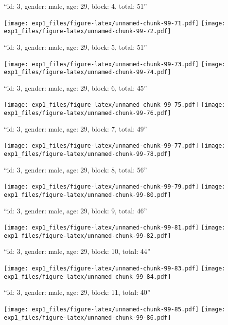 \documentclass[,]{article}
\begin{document}
\newpage
[1] 

``id: 3, gender: male, age: 29, block: 4, total: 51''

\texttt{[image: exp1\_files/figure-latex/unnamed-chunk-99-71.pdf]}
\texttt{[image: exp1\_files/figure-latex/unnamed-chunk-99-72.pdf]}

\newpage
[1] 

``id: 3, gender: male, age: 29, block: 5, total: 51''

\texttt{[image: exp1\_files/figure-latex/unnamed-chunk-99-73.pdf]}
\texttt{[image: exp1\_files/figure-latex/unnamed-chunk-99-74.pdf]}

\newpage
[1] 

``id: 3, gender: male, age: 29, block: 6, total: 45''

\texttt{[image: exp1\_files/figure-latex/unnamed-chunk-99-75.pdf]}
\texttt{[image: exp1\_files/figure-latex/unnamed-chunk-99-76.pdf]}

\newpage
[1] 

``id: 3, gender: male, age: 29, block: 7, total: 49''

\texttt{[image: exp1\_files/figure-latex/unnamed-chunk-99-77.pdf]}
\texttt{[image: exp1\_files/figure-latex/unnamed-chunk-99-78.pdf]}

\newpage
[1] 

``id: 3, gender: male, age: 29, block: 8, total: 56''

\texttt{[image: exp1\_files/figure-latex/unnamed-chunk-99-79.pdf]}
\texttt{[image: exp1\_files/figure-latex/unnamed-chunk-99-80.pdf]}

\newpage
[1] 

``id: 3, gender: male, age: 29, block: 9, total: 46''

\texttt{[image: exp1\_files/figure-latex/unnamed-chunk-99-81.pdf]}
\texttt{[image: exp1\_files/figure-latex/unnamed-chunk-99-82.pdf]}

\newpage
[1] 

``id: 3, gender: male, age: 29, block: 10, total: 44''

\texttt{[image: exp1\_files/figure-latex/unnamed-chunk-99-83.pdf]}
\texttt{[image: exp1\_files/figure-latex/unnamed-chunk-99-84.pdf]}

\newpage
[1] 

``id: 3, gender: male, age: 29, block: 11, total: 40''

\texttt{[image: exp1\_files/figure-latex/unnamed-chunk-99-85.pdf]}
\texttt{[image: exp1\_files/figure-latex/unnamed-chunk-99-86.pdf]}

\newpage
[1] 
\end{document}
